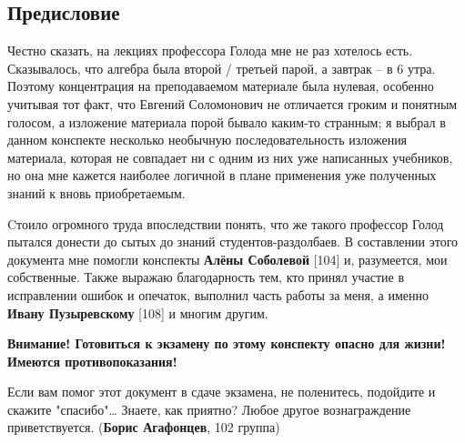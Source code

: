 \subsection*{Предисловие}
 
 Честно сказать, на лекциях профессора Голода мне не раз хотелось
 есть. Сказывалось, что алгебра была второй / третьей парой, а
 завтрак -- в 6 утра. Поэтому концентрация на преподаваемом материале
 была нулевая, особенно учитывая тот факт, что Евгений Соломонович не
 отличается гроким и понятным голосом, а изложение материала порой
 бывало каким-то странным; я выбрал в данном конспекте несколько
 необычную последовательность изложения материала, которая не
 совпадает ни с одним из них уже написанных учебников, но она мне
 кажется наиболее логичной в плане применения уже полученных знаний к
 вновь приобретаемым.
 
 Cтоило огромного труда впоследствии понять, что же такого профессор
 Голод пытался донести до сытых до знаний студентов-раздолбаев. В
 составлении этого документа мне помогли конспекты {\bfseries Алёны
 Соболевой} [104] и, разумеется, мои собственные. Также выражаю
 благодарность тем, кто принял участие в исправлении ошибок и
 опечаток, выполнил часть работы за меня, а именно {\bfseries Ивану
 Пузыревскому} [108] и многим другим.



\begin{petit}
{\color{red}\bf Внимание! Готовиться к экзамену по этому конспекту опасно
  для жизни! Имеются противопоказания!}
\end{petit} 

\begin{petit}
Если вам помог этот документ в сдаче экзамена, не поленитесь, подойдите и скажите "спасибо"\ldots
Знаете, как приятно? Любое другое вознаграждение приветствуется.
({\bfseries Борис Агафонцев}, 102 группа)
\end{petit}
 
 
